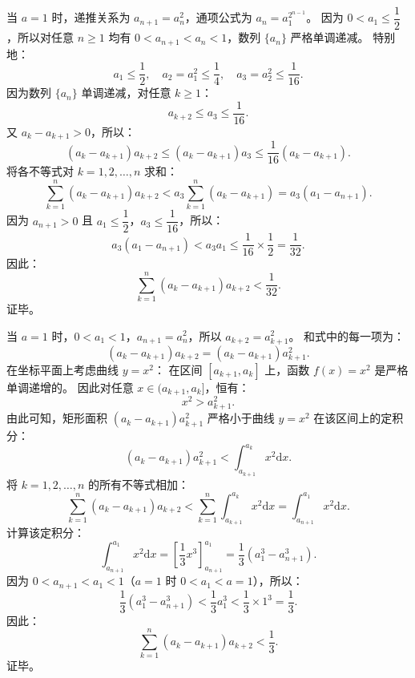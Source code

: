 \begin{answer}
当 $a = 1$ 时，递推关系为 $a_{n+1} = a_n^2$，通项公式为 $a_n = a_1^{2^{n-1}}$。
因为 $0 < a_1 \le \dfrac{1}{2}$，所以对任意 $n \ge 1$ 均有 $0 < a_{n+1} < a_n < 1$，数列 $\{a_n\}$ 严格单调递减。
特别地：
\nopagebreak[4]
\[a_1 \le \frac{1}{2}, \quad a_2 = a_1^2 \le \frac{1}{4}, \quad a_3 = a_2^2 \le \frac{1}{16}.\]
因为数列 $\{a_n\}$ 单调递减，对任意 $k \ge 1$：
\nopagebreak[4]
\[a_{k+2} \le a_3 \le \frac{1}{16}.\]
又 $a_k - a_{k+1} > 0$，所以：
\nopagebreak[4]
\[(a_k - a_{k+1}) a_{k+2} \le (a_k - a_{k+1}) a_3 \le \frac{1}{16}(a_k - a_{k+1}).\]
将各不等式对 $k = 1, 2, \dots, n$ 求和：
\nopagebreak[4]
\[\sum_{k=1}^n (a_k - a_{k+1}) a_{k+2} < a_3 \sum_{k=1}^n (a_k - a_{k+1}) = a_3 (a_1 - a_{n+1}).\]
因为 $a_{n+1} > 0$ 且 $a_1 \le \dfrac{1}{2}$，$a_3 \le \dfrac{1}{16}$，所以：
\nopagebreak[4]
\[a_3 (a_1 - a_{n+1}) < a_3 a_1 \le \frac{1}{16} \times \frac{1}{2} = \frac{1}{32}.\]
因此：
\nopagebreak[4]
\[\sum_{k=1}^n (a_k - a_{k+1}) a_{k+2} < \frac{1}{32}.\]
证毕。


当 $a = 1$ 时，$0 < a_1 < 1$，$a_{n+1} = a_n^2$，所以 $a_{k+2} = a_{k+1}^2$。
和式中的每一项为：
\nopagebreak[4]
\[(a_k - a_{k+1}) a_{k+2} = (a_k - a_{k+1}) a_{k+1}^2.\]
在坐标平面上考虑曲线 $y = x^2$：
在区间 $[a_{k+1}, a_k]$ 上，函数 $f(x) = x^2$ 是严格单调递增的。
因此对任意 $x \in (a_{k+1}, a_k]$，恒有：
\nopagebreak[4]
\[x^2 > a_{k+1}^2.\]
由此可知，矩形面积 $(a_k - a_{k+1}) a_{k+1}^2$ 严格小于曲线 $y = x^2$ 在该区间上的定积分：
\nopagebreak[4]
\[(a_k - a_{k+1}) a_{k+1}^2 < \int_{a_{k+1}}^{a_k} x^2 \mathrm{d}x.\]
将 $k = 1, 2, \dots, n$ 的所有不等式相加：
\nopagebreak[4]
\[\sum_{k=1}^n (a_k - a_{k+1}) a_{k+2} < \sum_{k=1}^n \int_{a_{k+1}}^{a_k} x^2 \mathrm{d}x = \int_{a_{n+1}}^{a_1} x^2 \mathrm{d}x.\]
计算该定积分：
\nopagebreak[4]
\[\int_{a_{n+1}}^{a_1} x^2 \mathrm{d}x = \left[ \frac{1}{3} x^3 \right]_{a_{n+1}}^{a_1} = \frac{1}{3}(a_1^3 - a_{n+1}^3).\]
因为 $0 < a_{n+1} < a_1 < 1$（$a = 1$ 时 $0 < a_1 < a = 1$），所以：
\nopagebreak[4]
\[\frac{1}{3}(a_1^3 - a_{n+1}^3) < \frac{1}{3} a_1^3 < \frac{1}{3} \times 1^3 = \frac{1}{3}.\]
因此：
\nopagebreak[4]
\[\sum_{k=1}^n (a_k - a_{k+1}) a_{k+2} < \frac{1}{3}.\]
证毕。




\end{answer}